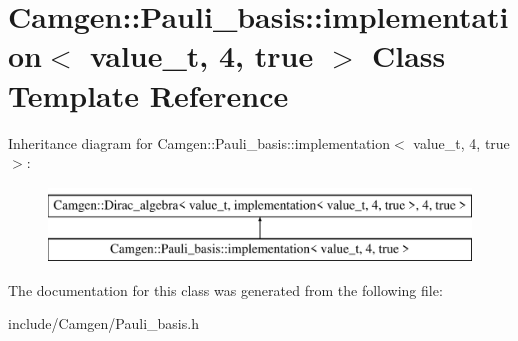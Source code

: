 \hypertarget{a00303}{\section{Camgen\-:\-:Pauli\-\_\-basis\-:\-:implementation$<$ value\-\_\-t, 4, true $>$ Class Template Reference}
\label{a00303}
}
Inheritance diagram for Camgen\-:\-:Pauli\-\_\-basis\-:\-:implementation$<$ value\-\_\-t, 4, true $>$\-:\begin{figure}[H]
\begin{center}
\leavevmode
\includegraphics[height=2.000000cm]{a00303}
\end{center}
\end{figure}


The documentation for this class was generated from the following file\-:\begin{DoxyCompactItemize}
\item 
include/\-Camgen/Pauli\-\_\-basis.\-h\end{DoxyCompactItemize}

